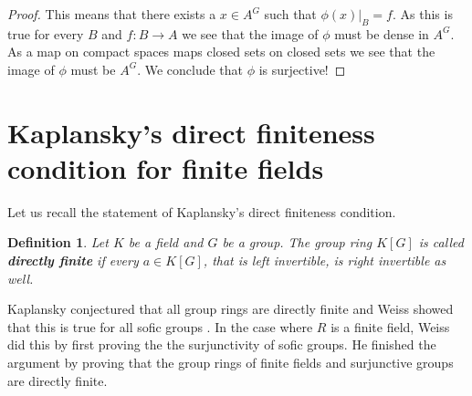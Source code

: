 \documentclass[titlepage, a4paper]{article}
\newtheorem{definition}[theorem]{Definition}
\theoremstyle{remark}
\begin{document}
\begin{proof}
\bigskip

This means that there exists a $x \in A^{G}$ such that $\phi(x)|_B = f$. As this is true for every  $B$ and $f:B\to A$ we see that the image of  $\phi$ must be dense in $A^{G}$. As a map on compact spaces maps closed sets on closed sets we see that the image of $\phi$ must be $A^{G}$. 
We conclude that $\phi$ is surjective!

\end{proof}

	\section{Kaplansky's direct finiteness condition for finite fields}
	Let us recall the statement of Kaplansky's direct finiteness condition.
	\begin{definition}
		Let $K$ be a field and $G$ be a group. The group ring $K[G]$ is called \textbf{directly finite} if every  $a \in K[G]$, that is left invertible, is right invertible as well. 
		
	\end{definition}
	Kaplansky conjectured that all group rings are directly finite and Weiss showed that this is true for all sofic groups \cite{weiss_2000}. 
	In the case where $R$ is a finite field, Weiss did this by first proving the the surjunctivity of sofic groups.
	He finished the argument by proving that the group rings of finite fields and surjunctive groups are directly finite.  
\end{document}
